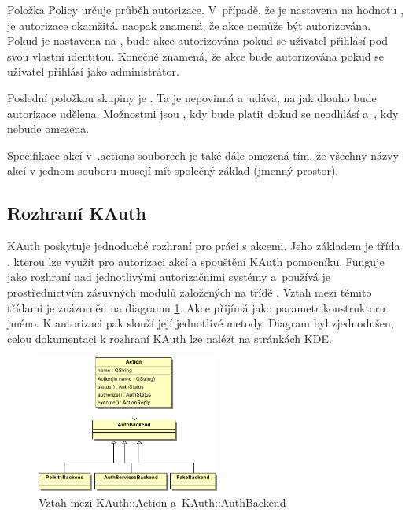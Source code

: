 Položka Policy určuje průběh autorizace. V~případě, že je nastavena na hodnotu , je autorizace okamžitá.  naopak znamená, že akce nemůže být autorizována. Pokud je nastavena na , bude akce autorizována pokud se uživatel přihlásí pod svou vlastní identitou. Konečně  znamená, že akce bude autorizována pokud se uživatel přihlásí jako administrátor.

Poslední položkou skupiny je . Ta je nepovinná a~udává, na jak dlouho bude autorizace udělena. Možnostmi jsou , kdy bude platit dokud se neodhlásí a~, kdy nebude omezena.

Specifikace akcí v~.actions souborech je také dále omezená tím, že všechny názvy akcí v jednom souboru musejí mít společný základ (jmenný prostor).

\subsection*{Rozhraní KAuth}
KAuth poskytuje jednoduché rozhraní pro práci s akcemi. Jeho základem je třída , kterou lze využít pro autorizaci akcí a spouštění KAuth pomocníku. Funguje jako rozhraní nad jednotlivými autorizačními systémy a~používá je prostřednictvím zásuvných modulů založených na třídě . Vztah mezi těmito třídami je znázorněn na diagramu \ref{fig:KAuthDiag}. Akce přijímá jako parametr konstruktoru jméno. K autorizaci pak slouží její jednotlivé metody. Diagram byl zjednodušen, celou dokumentaci k rozhraní KAuth lze nalézt na stránkách KDE.\cite{KAuthusage, KAuthAPI}


\begin{figure}[h]
    \centering
    \includegraphics[width=6cm]{obrazky/KAuthAction.pdf}
    \caption{Vztah mezi KAuth::Action a~KAuth::AuthBackend}
    \label{fig:KAuthDiag}
\end{figure}

